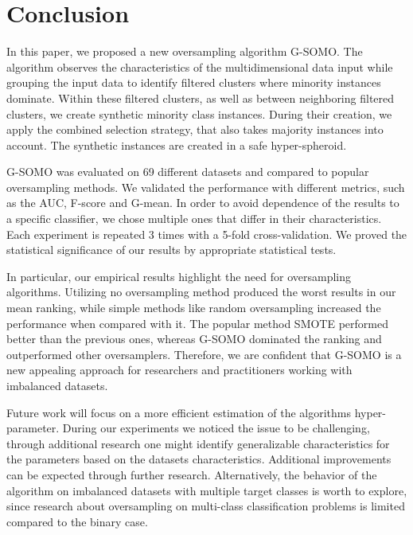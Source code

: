 \documentclass[parskip=full]{scrartcl}
\begin{document}
\section{Conclusion}

In this paper, we proposed a new oversampling algorithm G-SOMO. The algorithm
observes the characteristics of the multidimensional data input while grouping
the input data to identify filtered clusters where minority instances dominate.
Within these filtered clusters, as well as between neighboring filtered
clusters, we create synthetic minority class instances. During their creation,
we apply the combined selection strategy, that also takes majority instances
into account. The synthetic instances are created in a safe hyper-spheroid.

G-SOMO was evaluated on 69 different datasets and compared to popular
oversampling methods. We validated the performance with different metrics, such
as the AUC, F-score and G-mean. In order to avoid dependence of the results to a
specific classifier, we chose multiple ones that differ in their
characteristics. Each experiment is repeated 3 times with a 5-fold
cross-validation. We proved the statistical significance of our results by
appropriate statistical tests.

In particular, our empirical results highlight the need for oversampling
algorithms. Utilizing no oversampling method produced the worst results in our
mean ranking, while simple methods like random oversampling increased the
performance when compared with it. The popular method SMOTE performed better
than the previous ones, whereas G-SOMO dominated the ranking and outperformed
other oversamplers.  Therefore, we are confident that G-SOMO is a new appealing
approach for researchers and practitioners working with imbalanced datasets. 

Future work will focus on a more efficient estimation of the algorithms
hyper-parameter. During our experiments we noticed the issue to be challenging,
through additional research one might identify generalizable characteristics for
the parameters based on the datasets characteristics. Additional improvements
can be expected through further research. Alternatively, the behavior of the
algorithm on imbalanced datasets with multiple target classes is worth to
explore, since research about oversampling on multi-class classification
problems is limited compared to the binary case. 



\end{document}

